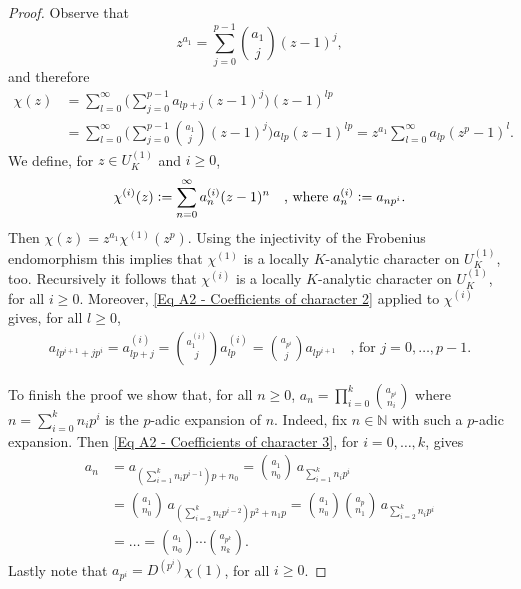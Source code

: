 \documentclass[a4paper, reqno, 10pt]{amsart}
\theoremstyle{definition}
\numberwithin{equation}{section}
\newcommand{\defeq}{\vcentcolon=}
\newcommand{\BN}{{\mathbb {N}}}
\begin{document}
\begin{proof}
	
	Observe that
	\[z^{a_1} = \sum_{j=0}^{p-1} \binom{a_1}{j} (z-1)^j  ,\]
	and therefore
	\begin{align*}
		\chi(z) &= \sum_{l=0}^{\infty} \bigg( \sum_{j=0}^{p-1} a_{lp+j} (z-1)^j \bigg) (z-1)^{lp} \\
		&= \sum_{l=0}^{\infty} \bigg( \sum_{j=0}^{p-1} \binom{a_1}{j} (z-1)^{j} \bigg) a_{lp} (z-1)^{lp} 
		= z^{a_1} \sum_{l=0}^{\infty} a_{lp} (z^p - 1)^l  .
	\end{align*}
	We define, for $z\in U_K^{(1)}$ and $i\geq 0$,
	\[\chi^{(i)} (z) \defeq \sum_{n=0}^{\infty} a^{(i)}_{n} (z-1)^n \quad\text{, where $a^{(i)}_n \defeq a_{n p^i}$.} \]
	Then $\chi(z) = z^{a_1} \chi^{(1)} (z^p)$. 
	Using the injectivity of the Frobenius endomorphism this implies that $\chi^{(1)}$ is a locally $K$-analytic character on $U_K^{(1)}$, too.
	Recursively it follows that $\chi^{(i)}$ is a locally $K$-analytic character on $U_K^{(1)}$, for all $i\geq 0$.
	Moreover, \eqref{Eq A2 - Coefficients of character 2} applied to $\chi^{(i)}$ gives, for all $l\geq 0$,
	\begin{align}\label{Eq A2 - Coefficients of character 3}
		a_{l p^{i+1} + j p^i} = a^{(i)}_{lp+j} = \binom{a_{1}^{(i)}}{j} a_{lp}^{(i)} = \binom{a_{p^i}}{j} a_{lp^{i+1}} \quad\text{, for $j=0,\ldots,p-1$.}
	\end{align}
	
	To finish the proof we show that, for all $n\geq 0$, $a_n = \prod_{i=0}^k \binom{a_{p^i}}{n_i} $ where $n=\sum_{i=0}^{k} n_i p^i$ is the $p$-adic expansion of $n$.
	Indeed, fix $n\in \BN$ with such a $p$-adic expansion.
	Then \eqref{Eq A2 - Coefficients of character 3}, for $i=0,\ldots,k$, gives
	\begin{align*}
		a_n &= a_{\left( \sum_{i=1}^k n_i p^{i-1}\right) p + n_0} = \binom{a_1}{n_0}\,a_{\sum_{i=1}^k n_i p^i } \\
		&= \binom{a_1}{n_0} \, a_{\left( \sum_{i=2}^k n_i p^{i-2}\right)p^2 + n_1 p} = \binom{a_1}{n_0} \binom{a_p}{n_1} \, a_{ \sum_{i=2}^k n_i p^{i} } \\
		&= \ldots = \binom{a_1}{n_0}\cdots\binom{a_{p^k}}{n_k} .
	\end{align*}
	Lastly note that $ a_{p^i}=D^{(p^i)}\chi(1) $, for all $i \geq 0$.
\end{proof}
\end{document}
